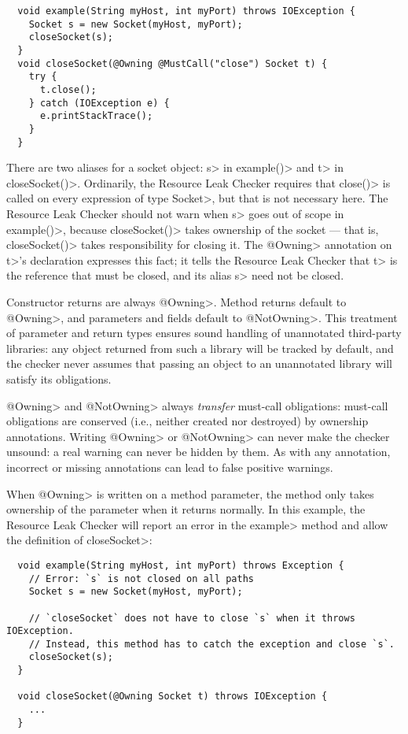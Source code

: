 \begin{verbatim}
  void example(String myHost, int myPort) throws IOException {
    Socket s = new Socket(myHost, myPort);
    closeSocket(s);
  }
  void closeSocket(@Owning @MustCall("close") Socket t) {
    try {
      t.close();
    } catch (IOException e) {
      e.printStackTrace();
    }
  }
\end{verbatim}

There are two aliases for a socket object: \<s> in \<example()> and \<t> in
\<closeSocket()>.  Ordinarily, the Resource Leak Checker requires that
\<close()> is called on every expression of type \<Socket>, but that is not
necessary here.  The Resource Leak Checker should not warn when
\<s> goes out of scope in \<example()>, because \<closeSocket()> takes ownership
of the socket --- that is, \<closeSocket()> takes responsibility for closing
it. The \<@Owning> annotation on \<t>'s declaration expresses this fact; it
tells the Resource Leak Checker that \<t> is the reference that must be
closed, and its alias \<s> need not be closed.

Constructor returns are always \<@Owning>.
Method returns default to \<@Owning>,
and parameters and fields default to \<@NotOwning>. This treatment of parameter and
return types ensures sound handling of unannotated third-party libraries: any
object returned from such a library will be tracked by default, and the checker
never assumes that passing an object to an unannotated library will satisfy its obligations.

\<@Owning> and \<@NotOwning> always \emph{transfer} must-call obligations: must-call
obligations are conserved (i.e., neither created nor destroyed) by ownership annotations.
Writing \<@Owning> or \<@NotOwning> can never make the checker
unsound:  a real warning can never be hidden by them.
As with any annotation, incorrect or missing annotations can lead to false positive warnings.


When \<@Owning> is written on a method parameter, the method only takes ownership of the
parameter when it returns normally.  In this example, the Resource Leak Checker will report
an error in the \<example> method and allow the definition of \<closeSocket>:

\begin{verbatim}
  void example(String myHost, int myPort) throws Exception {
    // Error: `s` is not closed on all paths
    Socket s = new Socket(myHost, myPort);

    // `closeSocket` does not have to close `s` when it throws IOException.
    // Instead, this method has to catch the exception and close `s`.
    closeSocket(s);
  }

  void closeSocket(@Owning Socket t) throws IOException {
    ...
  }
\end{verbatim}

